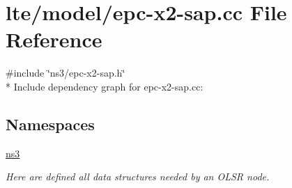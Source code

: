 \hypertarget{epc-x2-sap_8cc}{}\section{lte/model/epc-\/x2-\/sap.cc File Reference}
\label{epc-x2-sap_8cc}
{\ttfamily \#include \char`\"{}ns3/epc-\/x2-\/sap.\+h\char`\"{}}\\*
Include dependency graph for epc-\/x2-\/sap.cc\+:
\subsection*{Namespaces}
\begin{DoxyCompactItemize}
\item 
 \hyperlink{namespacens3}{ns3}
\begin{DoxyCompactList}\small\item\em Here are defined all data structures needed by an O\+L\+SR node. \end{DoxyCompactList}\end{DoxyCompactItemize}
